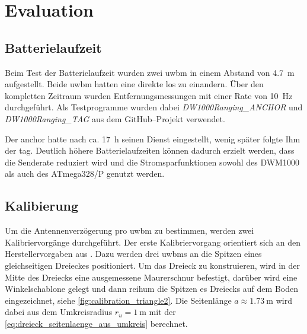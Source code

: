 \begin{comment}
--------------------------------------------------------------------------------
\end{comment}
\chapter{Evaluation}\label{ch:eval}


\begin{comment}
--------------------------------------------------------------------------------
- TODO: Stimmen die 10Hz?
- Start 13:50-23:50, 12:50-20:00 => 10+7 => 17 Stunden
\end{comment}
\section{Batterielaufzeit}

Beim Test der Batterielaufzeit wurden zwei \gls{uwbm} in einem Abstand von \SI{4.7}{\metre} aufgestellt. Beide \gls{uwbm} hatten eine direkte \gls{los} zu einandern. Über den kompletten Zeitraum wurden Entfernungsmessungen mit einer Rate von \SI{10}{\hertz} durchgeführt. Als Testprogramme wurden dabei \textit{DW1000Ranging\_ANCHOR} und \textit{DW1000Ranging\_TAG} aus dem GitHub--Projekt \cite{Trojer2015} verwendet.

Der \Gls{anchor} hatte nach ca. \SI{17}{\hour} seinen Dienst eingestellt, wenig später folgte Ihm der \Gls{tag}. Deutlich höhere Batterielaufzeiten können dadurch erzielt werden, dass die Senderate reduziert wird und die Stromsparfunktionen sowohl des DWM1000 als auch des ATmega328/P genutzt werden.


\begin{comment}
--------------------------------------------------------------------------------
- 3-sigma
	- https://www.easycalculation.com/statistics/learn-three-sigma.php
	- https://bizfluent.com/how-5214886-calculate-sigma.html
	- https://stackoverflow.com/questions/28699342/calculate-the-3rd-standard-deviation-for-an-array
\end{comment}
\section{Kalibierung}

Um die Antennenverzögerung pro \Gls{uwbm} zu bestimmen, werden zwei Kalibriervorgänge durchgeführt. Der erste Kalibriervorgang orientiert sich an den Herstellervorgaben aus \cite{decawave2014calibration}. Dazu werden drei \Glspl{uwbm} an die Spitzen eines gleichseitigen Dreieckes positioniert. Um das Dreieck zu konstruieren, wird in der Mitte des Dreiecks eine ausgemessene Maurerschnur befestigt, darüber wird eine Winkelschablone gelegt und dann reihum die Spitzen es Dreiecks auf dem Boden eingezeichnet, siehe \autoref{fig:calibration_triangle2}. Die Seitenlänge $a \approx \SI{1.73}{\meter}$ wird dabei aus dem Umkreisradius $r_u = \SI{1}{\meter}$ mit der \autoref{eq:dreieck_seitenlaenge_aus_umkreis} berechnet.

